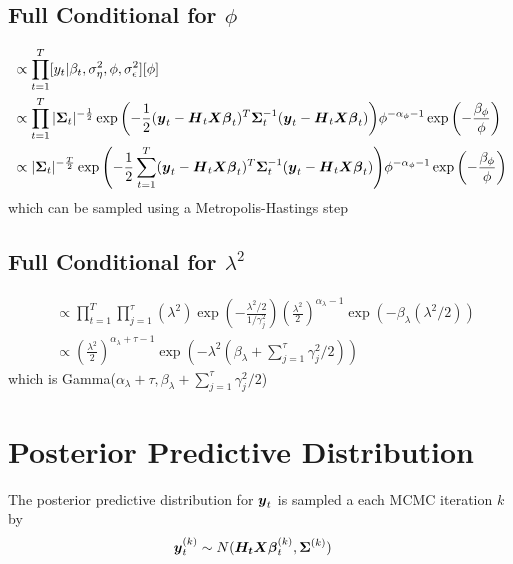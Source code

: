 \documentclass[fleqn]{article}
\def\bm#1{\mbox{\boldmath $#1$}}
\begin{document}
\subsection{Full Conditional for $\phi$}
%
\begin{align*}
  [\phi | \cdot] & \propto \prod_{t = 1}^T [y_t | \beta_t, \sigma^2_\eta, \phi, \sigma^2_\epsilon] [\phi]\\
%
& \propto \prod_{t = 1}^T | \bm{\Sigma}_t |^{ - \frac{1} {2}} \exp{ \left( - \frac{1} {2} (\bm{y}_t - \bm{H}_t \bm{X} \bm{\beta}_t)^T \bm{\Sigma}_t^{ - 1} (\bm{y}_t - \bm{H}_t \bm{X} \bm{\beta}_t) \right) } \phi^{ - \alpha_\phi - 1} \exp{ \left( - \frac{\beta_\phi} {\phi} \right) }\\
%
& \propto | \bm{\Sigma}_t |^{ - \frac{T} {2}} \exp{ \left( - \frac{1} {2} \sum_{t = 1}^T (\bm{y}_t - \bm{H}_t \bm{X} \bm{\beta}_t)^T \bm{\Sigma}_t^{ - 1} (\bm{y}_t - \bm{H}_t \bm{X} \bm{\beta}_t) \right) } \phi^{ - \alpha_\phi - 1} \exp{ \left( - \frac{\beta_\phi} {\phi} \right) }\\
\end{align*}
% 
which can be sampled using a Metropolis-Hastings step
%
\subsection*{Full Conditional for $\lambda^2$}
%
\begin{align*}
[\lambda^2 | \cdot] & \propto \prod_{t = 1}^T \prod_{j = 1}^\tau (\lambda^2) \exp{ \left( - \frac{\lambda^2 / 2} {1 / \gamma^2_j} \right) } (\frac{\lambda^2} {2})^{\alpha_\lambda - 1} \exp{ \left( - \beta_\lambda (\lambda^2 /2) \right) }\\
%
& \propto (\frac{\lambda^2} {2})^{\alpha_\lambda + \tau - 1} \exp{ \left( - \lambda^2(\beta_\lambda + \sum_{j = 1}^\tau \gamma^2_j / 2) \right) }
\end{align*}
%
which is Gamma($\alpha_\lambda + \tau, \beta_\lambda + \sum_{j = 1}^\tau \gamma^2_j / 2$)
%
\section{Posterior Predictive Distribution}
%
The posterior predictive distribution for $\bm{y}_t$ is sampled a each MCMC iteration $k$ by
\begin{align*}
  \bm{y}^{(k)}_t & \sim N(\bm{H_t} \bm{X} \bm{\beta}^{(k)}_t, \bm{\Sigma}^{(k)})
\end{align*}
\end{document}

